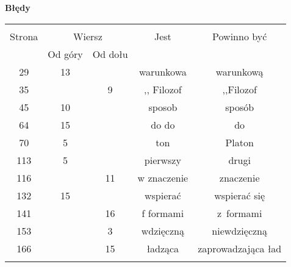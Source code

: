 \documentclass[a4paper,11pt]{article}
\newcommand{\spaceOne}{2em}
\newcommand{\tb}{\textbf}
\newcommand{\Center}[1]{\begin{center} #1 \end{center}}
\newcommand{\CenterTB}[1]{\Center{\tb{#1}}}
\begin{document}
\CenterTB{Błędy}
\begin{center}
  \begin{tabular}{|c|c|c|c|c|}
    \hline
    & \multicolumn{2}{c|}{} & & \\
    Strona & \multicolumn{2}{c|}{Wiersz}& Jest & Powinno być \\ \cline{2-3}
    & Od góry & Od dołu &  &  \\ \hline
    29 & 13 & & warunkowa & warunkową \\
    35 & & 9 & ,, Filozof %
           & ,,Filozof \\ %
    45 & 10 & & sposob & sposób \\
    64 & 15 & & do do & do \\
    70 & 5 & & ton & Platon \\
    113 & 5 & & pierwszy & drugi \\
    116 & & 11 & w znaczenie & znaczenie \\
    132 & 15 & & wspierać & wspierać się \\
    141 & & 16 & f formami & z~formami \\
    153 & & 3 & wdzięczną & niewdzięczną \\
    166 & & 15 & ładząca & zaprowadzająca ład \\
    & & & & \\ \hline
  \end{tabular}
\end{center}

\vspace{\spaceOne}



 {}
\end{document}
